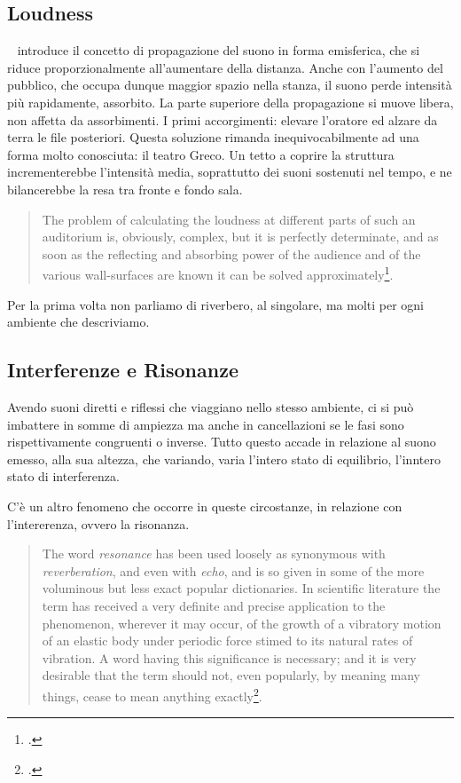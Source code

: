 \subsection{Loudness}

\ws~ introduce il concetto di propagazione del suono in forma emisferica, che
si riduce proporzionalmente all'aumentare della distanza. Anche con l'aumento
del pubblico, che occupa dunque maggior spazio nella stanza, il suono perde
intensità più rapidamente, assorbito. La parte superiore della propagazione si
muove libera, non affetta da assorbimenti. I primi accorgimenti: elevare
l'oratore ed alzare da terra le file posteriori. Questa soluzione rimanda
inequivocabilmente ad una forma molto conosciuta: il teatro Greco. Un tetto a
coprire la struttura incrementerebbe l'intensità media, soprattutto dei suoni
sostenuti nel tempo, e ne bilancerebbe la resa tra fronte e fondo sala.

\begin{quote}
  The problem of calculating the loudness at different parts of such an
  auditorium is, obviously, complex, but it is perfectly determinate, and as
  soon as the reflecting and absorbing power of the audience and of the various
  wall-surfaces are known it can be solved approximately\footcite{ws:rev}.
\end{quote}

Per la prima volta non parliamo di riverbero, al singolare, ma molti per ogni
ambiente che descriviamo.

\subsection{Interferenze e Risonanze}

Avendo suoni diretti e riflessi che viaggiano nello stesso ambiente, ci si può
imbattere in somme di ampiezza ma anche in cancellazioni se le fasi sono
rispettivamente congruenti o inverse. Tutto questo accade in relazione al suono
emesso, alla sua altezza, che variando, varia l'intero stato di equilibrio,
l'inntero stato di interferenza.

C'è un altro fenomeno che occorre in queste circostanze, in relazione con
l'intererenza, ovvero la risonanza.

\begin{quote}
  The word \emph{resonance} has been used loosely as synonymous with
  \emph{reverberation}, and even with \emph{echo}, and is so given in some of
  the more voluminous but less exact popular dictionaries. In scientific
  literature the term has received a very definite and precise application to
  the phenomenon, wherever it may occur, of the growth of a vibratory motion of
  an elastic body under periodic force stimed to its natural rates of vibration.
  A word having this significance is necessary; and it is very desirable that
  the term should not, even popularly, by meaning many things, cease to mean
  anything exactly\footcite{ws:rev}.
\end{quote}

